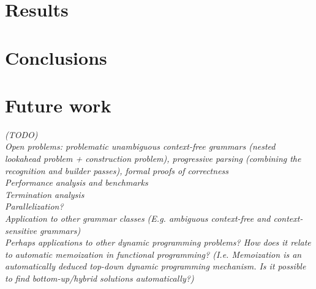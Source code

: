 \documentclass[11pt]{article}
\begin{document}
\section*{Results}

\section*{Conclusions}

\section*{Future work}

\emph{ %
(TODO)\\
Open problems: problematic unambiguous context-free grammars (nested lookahead problem + construction problem), progressive parsing (combining the recognition and builder passes), formal proofs of correctness\\
Performance analysis and benchmarks\\
Termination analysis\\
Parallelization?\\
Application to other grammar classes (E.g. ambiguous context-free and context-sensitive grammars)\\
Perhaps applications to other dynamic programming problems? How does it relate to automatic memoization in functional programming? (I.e. Memoization is an automatically deduced top-down dynamic programming mechanism. Is it possible to find bottom-up/hybrid solutions automatically?)
}



\end{document}
